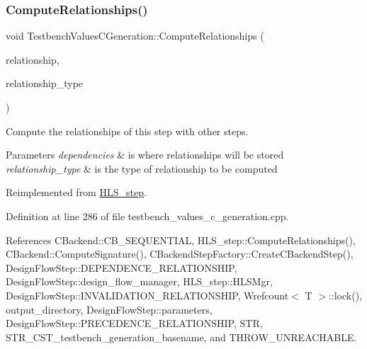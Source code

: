\mbox{\label{classTestbenchValuesCGeneration_a3724358a7237a76d6446d9bcb1ffff7c}} 
\subsubsection{\texorpdfstring{Compute\+Relationships()}{ComputeRelationships()}}
{\footnotesize\ttfamily void Testbench\+Values\+C\+Generation\+::\+Compute\+Relationships (\begin{DoxyParamCaption}\item[{\hyperlink{classDesignFlowStepSet}{Design\+Flow\+Step\+Set} \&}]{relationship,  }\item[{const \hyperlink{classDesignFlowStep_a723a3baf19ff2ceb77bc13e099d0b1b7}{Design\+Flow\+Step\+::\+Relationship\+Type}}]{relationship\+\_\+type }\end{DoxyParamCaption})\hspace{0.3cm}{\ttfamily [virtual]}}



Compute the relationships of this step with other steps. 


\begin{DoxyParams}{Parameters}
{\em dependencies} & is where relationships will be stored \\
\hline
{\em relationship\+\_\+type} & is the type of relationship to be computed \\
\hline
\end{DoxyParams}


Reimplemented from \hyperlink{classHLS__step_ad5c58777d9b466fb3eee185f6d3ac993}{H\+L\+S\+\_\+step}.



Definition at line 286 of file testbench\+\_\+values\+\_\+c\+\_\+generation.\+cpp.



References C\+Backend\+::\+C\+B\+\_\+\+S\+E\+Q\+U\+E\+N\+T\+I\+AL, H\+L\+S\+\_\+step\+::\+Compute\+Relationships(), C\+Backend\+::\+Compute\+Signature(), C\+Backend\+Step\+Factory\+::\+Create\+C\+Backend\+Step(), Design\+Flow\+Step\+::\+D\+E\+P\+E\+N\+D\+E\+N\+C\+E\+\_\+\+R\+E\+L\+A\+T\+I\+O\+N\+S\+H\+IP, Design\+Flow\+Step\+::design\+\_\+flow\+\_\+manager, H\+L\+S\+\_\+step\+::\+H\+L\+S\+Mgr, Design\+Flow\+Step\+::\+I\+N\+V\+A\+L\+I\+D\+A\+T\+I\+O\+N\+\_\+\+R\+E\+L\+A\+T\+I\+O\+N\+S\+H\+IP, Wrefcount$<$ T $>$\+::lock(), output\+\_\+directory, Design\+Flow\+Step\+::parameters, Design\+Flow\+Step\+::\+P\+R\+E\+C\+E\+D\+E\+N\+C\+E\+\_\+\+R\+E\+L\+A\+T\+I\+O\+N\+S\+H\+IP, S\+TR, S\+T\+R\+\_\+\+C\+S\+T\+\_\+testbench\+\_\+generation\+\_\+basename, and T\+H\+R\+O\+W\+\_\+\+U\+N\+R\+E\+A\+C\+H\+A\+B\+LE.

